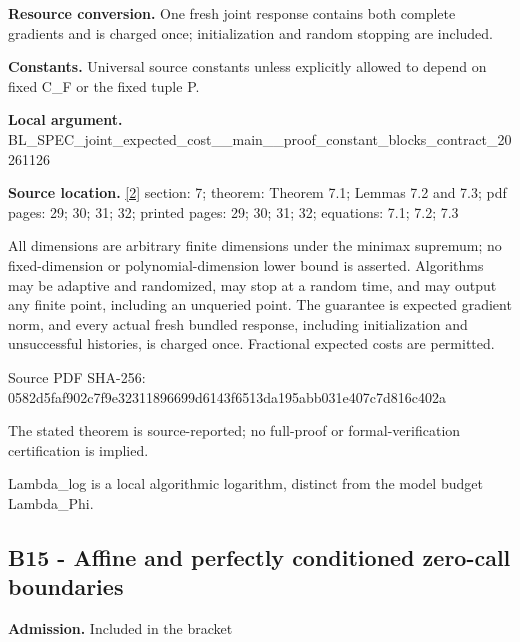 \documentclass[10pt,a4paper]{article}
\begin{document}
\textbf{Resource conversion.} One fresh joint response contains both complete gradients and is charged once; initialization and random stopping are included.



\textbf{Constants.} Universal source constants unless explicitly allowed to depend on fixed C\_F or the fixed tuple P.



\textbf{Local argument.} BL\_SPEC\_joint\_expected\_c\allowbreak{}ost\_\_main\_\_proof\_constan\allowbreak{}t\_blocks\_contract\_202611\allowbreak{}26



\textbf{Source location.} \href{https://github.com/WU-Wendao/Colombo/blob/main/colombo_sensorium/Complexity_altas/data/sources/colombo/SFO_JOINT_20261126/manuscript.pdf}{[2]} section: 7; theorem: Theorem 7.1; Lemmas 7.2 and 7.3; pdf pages: 29; 30; 31; 32; printed pages: 29; 30; 31; 32; equations: 7.1; 7.2; 7.3



All dimensions are arbitrary finite dimensions under the minimax supremum; no fixed-dimension or polynomial-dimension lower bound is asserted. Algorithms may be adaptive and randomized, may stop at a random time, and may output any finite point, including an unqueried point. The guarantee is expected gradient norm, and every actual fresh bundled response, including initialization and unsuccessful histories, is charged once. Fractional expected costs are permitted.



Source PDF SHA-256: 0582d5faf902c7f9e3231189\allowbreak{}6699d6143f6513da195abb03\allowbreak{}1e407c7d816c402a



The stated theorem is source-reported; no full-proof or formal-verification certification is implied.



Lambda\_log is a local algorithmic logarithm, distinct from the model budget Lambda\_Phi.



\subsection{B15 - Affine and perfectly conditioned zero-call boundaries}


\textbf{Admission.} Included in the bracket
\end{document}
